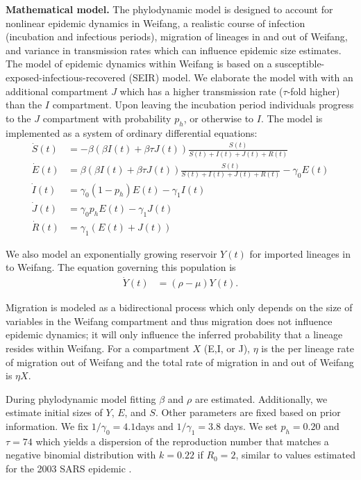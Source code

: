 \documentclass[9pt,lineno,onehalfspacing]{elife}
\begin{document}
{\flushleft\bf Mathematical model.} The phylodynamic model is designed to account for nonlinear epidemic dynamics in Weifang, a realistic course of infection (incubation and infectious periods), migration of lineages in and out of Weifang, and variance in transmission rates which can influence epidemic size estimates. 
The model of epidemic dynamics within Weifang is based on a susceptible-exposed-infectious-recovered (SEIR) model. 
We elaborate the model with with an additional compartment $J$ which has a higher transmission rate ($\tau$-fold higher) than the $I$ compartment. 
Upon leaving the incubation period individuals progress to the $J$ compartment with probability $p_h$, or otherwise to $I$. 
The model is implemented as a system of ordinary differential equations:
\begin{align}
\dot{S}(t) &= - \beta \left( \beta I(t) + \beta \tau J(t) \right)  \frac{S(t)}{S(t) + I(t) + J(t) + R(t)} \\  
\dot{E}(t) &= \beta \left( \beta I(t) + \beta \tau J(t) \right)  \frac{S(t)}{S(t) + I(t) + J(t) + R(t)} - \gamma_0 E(t) \\  
\dot{I}(t) &= \gamma_0 (1-p_h) E(t) - \gamma_1 I(t) \\
\dot{J}(t) &= \gamma_0 p_h E(t) - \gamma_1 J(t)  \\
\dot{R}(t) &= \gamma_1 (E(t) + J(t) )  
\end{align}

We also model an exponentially growing reservoir $Y(t)$ for imported lineages in to Weifang. 
The equation governing this population is 
\begin{align}
\dot{Y}(t) &= (\rho - \mu) Y(t).
\end{align}

Migration is modeled as a bidirectional process which only depends on the size of variables in the Weifang compartment and thus migration does not influence epidemic dynamics; it will only influence the inferred probability that a lineage resides within Weifang. 
For a compartment $X$ (E,I, or J), $\eta$ is the per lineage rate of migration out of Weifang and the total rate of migration in and out of Weifang is $ \eta X $. 

During phylodynamic model fitting $\beta$ and $\rho$ are estimated. 
Additionally, we estimate initial sizes of $Y$, $E$, and $S$. 
Other parameters are fixed based on prior information. We fix $1/\gamma_0=4.1$days and $1/\gamma_1=3.8$ days. 
We set $p_h=0.20$ and $\tau=74$ which yields a dispersion of the reproduction number that matches a negative binomial distribution with $k=0.22$ if $R_0=2$, similar to values estimated for the 2003 SARS epidemic \citep{Lloyd-Smith2005-oz}.  %
\end{document}

